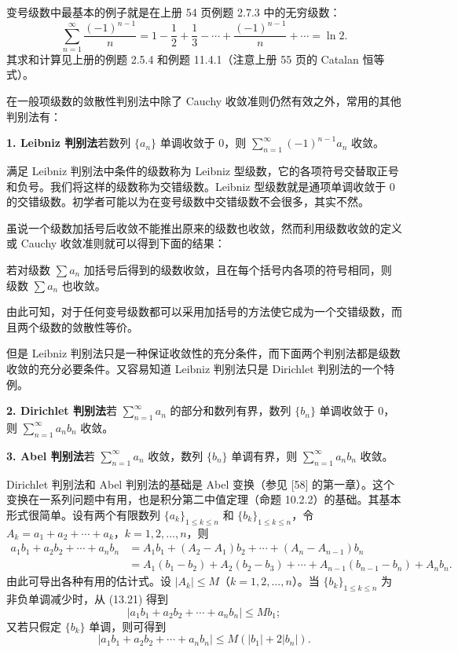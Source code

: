 变号级数中最基本的例子就是在上册 54 页例题 2.7.3 中的无穷级数：
\[
\sum_{n=1}^{\infty}\frac{(-1)^{n-1}}n=1-\frac12+\frac13-\cdots+\frac{(-1)^{n-1}}n+\cdots=\ln2.
\]
其求和计算见上册的例题 2.5.4 和例题 11.4.1（注意上册 55 页的 Catalan 恒等式）。

在一般项级数的敛散性判别法中除了 Cauchy 收敛准则仍然有效之外，常用的其他判别法有：

\textbf{1. Leibniz 判别法}\quad 若数列 $\{a_n\}$ 单调收敛于 0，则 $\sum_{n=1}^{\infty}(-1)^{n-1}a_n$ 收敛。

\begin{xremark}
满足 Leibniz 判别法中条件的级数称为 Leibniz 型级数，它的各项符号交替取正号和负号。我们将这样的级数称为交错级数。Leibniz 型级数就是通项单调收敛于 0 的交错级数。初学者可能以为在变号级数中交错级数不会很多，其实不然。
\end{xremark}

虽说一个级数加括号后收敛不能推出原来的级数也收敛，然而利用级数收敛的定义或 Cauchy 收敛准则就可以得到下面的结果：

\begin{xproposition}[13.3.2]
若对级数 $\sum a_n$ 加括号后得到的级数收敛，且在每个括号内各项的符号相同，则级数 $\sum a_n$ 也收敛。
\end{xproposition}

由此可知，对于任何变号级数都可以采用加括号的方法使它成为一个交错级数，而且两个级数的敛散性等价。

但是 Leibniz 判别法只是一种保证收敛性的充分条件，而下面两个判别法都是级数收敛的充分必要条件。又容易知道 Leibniz 判别法只是 Dirichlet 判别法的一个特例。

\textbf{2. Dirichlet 判别法}\quad 若 $\sum_{n=1}^{\infty}a_n$ 的部分和数列有界，数列 $\{b_n\}$ 单调收敛于 0，则 $\sum_{n=1}^{\infty}a_nb_n$ 收敛。

\textbf{3. Abel 判别法}\quad 若 $\sum_{n=1}^{\infty}a_n$ 收敛，数列 $\{b_n\}$ 单调有界，则 $\sum_{n=1}^{\infty}a_nb_n$ 收敛。

\begin{xremark}
Dirichlet 判别法和 Abel 判别法的基础是 Abel 变换（参见 [58] 的第一章）。这个变换在一系列问题中有用，也是积分第二中值定理（命题 10.2.2）的基础。其基本形式很简单。设有两个有限数列 $\{a_k\}_{1\leq k\leq n}$ 和 $\{b_k\}_{1\leq k\leq n}$，令 $A_k=a_1+a_2+\cdots+a_k$，$k=1,2,\ldots,n$，则
\begin{equation}
\begin{aligned}
a_1b_1+a_2b_2+\cdots+a_nb_n
&=A_1b_1+(A_2-A_1)b_2+\cdots+(A_n-A_{n-1})b_n\\
&=A_1(b_1-b_2)+A_2(b_2-b_3)+\cdots+A_{n-1}(b_{n-1}-b_n)+A_nb_n.
\end{aligned}
\tag{13.21}
\end{equation}
由此可导出各种有用的估计式。设 $|A_k|\leq M$（$k=1,2,\ldots,n$）。当 $\{b_k\}_{1\leq k\leq n}$ 为非负单调减少时，从 (13.21) 得到
\begin{equation}
|a_1b_1+a_2b_2+\cdots+a_nb_n|\leq Mb_1;
\tag{13.22}
\end{equation}
又若只假定 $\{b_k\}$ 单调，则可得到
\begin{equation}
|a_1b_1+a_2b_2+\cdots+a_nb_n|\leq M(|b_1|+2|b_n|).
\tag{13.23}
\end{equation}
\end{xremark}

